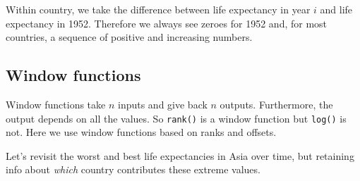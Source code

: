 \documentclass[
]{book}
\newenvironment{Shaded}{\begin{snugshade}}{\end{snugshade}}
\newcommand{\CommentTok}[1]{\textcolor[rgb]{0.56,0.35,0.01}{\textit{#1}}}
\newcommand{\DataTypeTok}[1]{\textcolor[rgb]{0.13,0.29,0.53}{#1}}
\newcommand{\DecValTok}[1]{\textcolor[rgb]{0.00,0.00,0.81}{#1}}
\newcommand{\KeywordTok}[1]{\textcolor[rgb]{0.13,0.29,0.53}{\textbf{#1}}}
\newcommand{\NormalTok}[1]{#1}
\newcommand{\OperatorTok}[1]{\textcolor[rgb]{0.81,0.36,0.00}{\textbf{#1}}}
\newcommand{\StringTok}[1]{\textcolor[rgb]{0.31,0.60,0.02}{#1}}
\begin{document}
\begin{Shaded}
\end{Shaded}

Within country, we take the difference between life expectancy in year \(i\) and life expectancy in 1952. Therefore we always see zeroes for 1952 and, for most countries, a sequence of positive and increasing numbers.

\hypertarget{window-functions}{%
\subsection{Window functions}\label{window-functions}}

Window functions take \(n\) inputs and give back \(n\) outputs. Furthermore, the output depends on all the values. So \texttt{rank()} is a window function but \texttt{log()} is not. Here we use window functions based on ranks and offsets.

Let's revisit the worst and best life expectancies in Asia over time, but retaining info about \emph{which} country contributes these extreme values.
\end{document}
